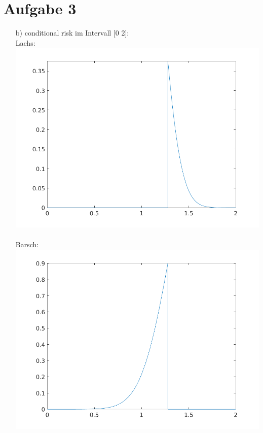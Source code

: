 \documentclass[a4paper]{scrartcl}
\begin{document}
	\section*{Aufgabe 3}
	\begin{itemize}
		\item[b)] conditional risk im Intervall [0 2]:\\
		Lachs:\\
		\includegraphics*[scale = 0.5]{assignment2_data/plots/cond_risk_salmon.png}\\ \ \\
		Barsch:\\
		\includegraphics*[scale = 0.5]{assignment2_data/plots/cond_risk_seabass.png}
	\end{itemize}
	
\end{document}
